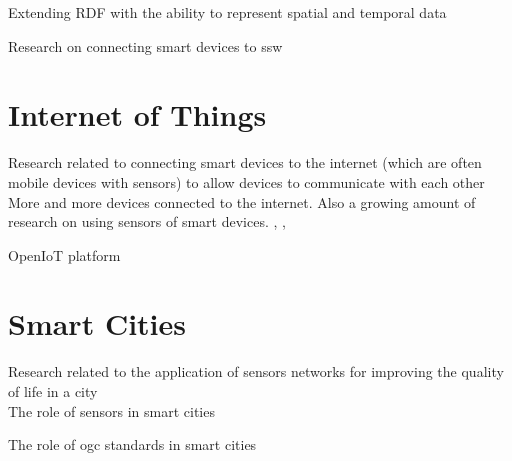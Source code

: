 Extending RDF with the ability to represent spatial and temporal data \citep{SSW:Koubarakis}

Research on connecting smart devices to \ac{ssw} \citep{SSW:Vera}  


\section{Internet of Things}
Research related to connecting smart devices to the internet (which are often mobile devices with sensors) to allow devices to communicate with each other \\

More and more devices connected to the internet. Also a growing amount of research on using sensors of smart devices. \citep{IOT:Waher}, \citep{SSW:Calbimonte}, \citep{IOT:Zarko}


OpenIoT platform \citep{IOT:Calbimonte}


\section{Smart Cities}
Research related to the application of sensors networks for improving the quality of life in a city \\ 

The role of sensors in smart cities \citep{IOT:Zanelli}

The role of \ac{ogc} standards in smart cities \citep{SC:OGC}
